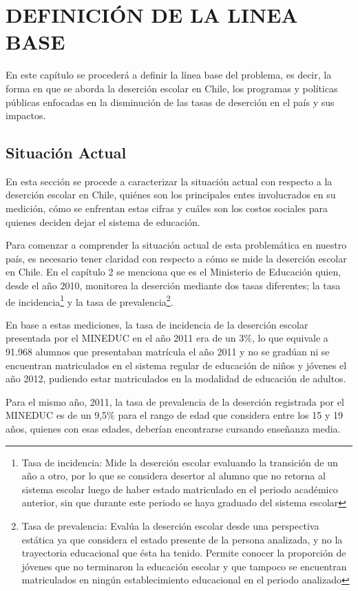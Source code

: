 \chapter{DEFINICIÓN DE LA LINEA BASE}
\label{ch:lineabase}

En este capítulo se procederá a definir la línea base del problema, es decir, la forma en que se aborda la deserción escolar en Chile, los programas y políticas públicas enfocadas en la disminución de las tasas de deserción en el país y sus impactos.

\section{Situación Actual}
En esta sección se procede a caracterizar la situación actual con respecto a la deserción escolar en Chile, quiénes son los principales entes involucrados en su medición, cómo se enfrentan estas cifras y cuáles son los costos sociales para quienes deciden dejar el sistema de educación.

Para comenzar a comprender la situación actual de esta problemática en nuestro país, es necesario tener claridad con respecto a cómo se mide la deserción escolar en Chile. En el capítulo 2 se menciona que es el Ministerio de Educación quien, desde el año 2010, monitorea la deserción mediante dos tasas diferentes; la tasa de incidencia\footnote{Tasa de incidencia: Mide la deserción escolar evaluando la transición de un año a otro, por lo que se considera desertor al alumno que no retorna al sistema escolar luego de haber estado matriculado en el periodo académico anterior, sin que durante este periodo se haya graduado del sistema escolar} y la tasa de prevalencia\footnote{Tasa de prevalencia: Evalúa la deserción escolar desde una perspectiva estática ya que considera el estado presente de la persona analizada, y no la trayectoria educacional que ésta  ha  tenido. Permite conocer la proporción de jóvenes que no terminaron la educación escolar y que tampoco se encuentran matriculados en ningún establecimiento educacional en el periodo analizado}.

En base a estas mediciones, la tasa de incidencia de la deserción escolar presentada por el MINEDUC en el año 2011 era de un 3\%, lo que equivale a 91.968 alumnos que presentaban matrícula el año 2011 y no se gradúan ni se encuentran matriculados en el sistema regular de educación de niños y jóvenes el año 2012, pudiendo estar matriculados en la modalidad de educación de adultos. 

Para el mismo año, 2011, la tasa de prevalencia de la deserción registrada por el MINEDUC es de un 9,5\% para el rango de edad que considera entre los 15 y 19 años, quienes con esas edades, deberían encontrarse cursando enseñanza media. 

